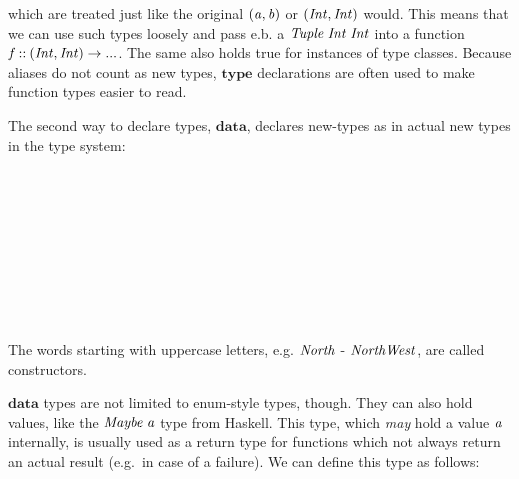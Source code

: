\documentclass[paper=A4,twoside=true,openright,parskip=full,chapterprefix=true,headings=normal,bibliography=totoc,listof=totoc,titlepage=on,captions=tableabove,draft=false,british]{scrreprt}%
\begin{document}
which are treated just like the original \ensuremath{(\Varid{a},\Varid{b})} or \ensuremath{(\Conid{Int},\Conid{Int})} would.
This means that we can use such types loosely and pass e.b. a
\ensuremath{\Conid{Tuple}\;\Conid{Int}\;\Conid{Int}} into a function \ensuremath{\Varid{f}\mathbin{::}(\Conid{Int},\Conid{Int})\to \mathbin{...}}. The same also
holds true for instances of type classes. Because aliases do not count
as new types, \ensuremath{\mathbf{type}} declarations are often used to make function types
easier to read.

The second way to declare types, \ensuremath{\mathbf{data}}, declares new-types as in actual
new types in the type system:


\begin{hscode}\SaveRestoreHook
{}%
%
%
%
\>[B]{}\;\mathrel{=}{}\<[E]%
\\
\>[B]{}\<[7]%
\>[7]{}\<[E]%
\\
\>[B]{}\<[5]%
\>[5]{}\mid {}\<[E]%
\\
\>[B]{}\<[5]%
\>[5]{}\mid {}\<[E]%
\\
\>[B]{}\<[5]%
\>[5]{}\mid {}\<[E]%
\\
\>[B]{}\<[5]%
\>[5]{}\mid {}\<[E]%
\\
\>[B]{}\<[5]%
\>[5]{}\mid {}\<[E]%
\\
\>[B]{}\<[5]%
\>[5]{}\mid {}\<[E]%
\\
\>[B]{}\<[5]%
\>[5]{}\mid {}\<[E]%
\ColumnHook
\end{hscode}\resethooks
\vspace{-2\baselineskip}

The words starting with uppercase letters, e.g. \ensuremath{\Conid{North}} - \ensuremath{\Conid{NorthWest}},
are called constructors.

\ensuremath{\mathbf{data}} types are not limited to enum-style types, though. They can also
hold values, like the \ensuremath{\Conid{Maybe}\;\Varid{a}} type from Haskell. This type, which
\emph{may} hold a value \ensuremath{\Varid{a}} internally, is usually used as a return type
for functions which not always return an actual result (e.g.~in case of
a failure). We can define this type as follows:
\end{document}
